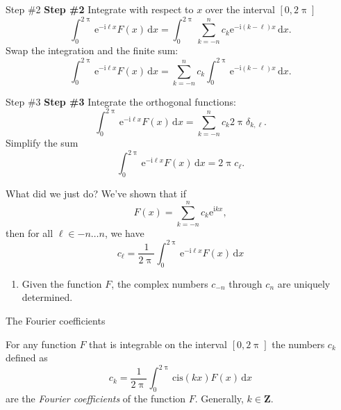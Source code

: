 \documentclass[portrait,fleqn,12pt]{beamer}
\newcommand{\integers}{\mathbf{Z}}
\newcommand{\cis}{\mathrm{cis}}
\newcommand{\euler}{\mathrm{e}}
\newcommand{\imag}{\mathrm{i}}
\newenvironment{handlist}
   {\begin{enumerate}[\faHandPointRight]
       \addtolength{\itemsep}{0.0\itemsep}}
     {\end{enumerate}}
\begin{document}
\begin{frame}{Step \#2}
    \textbf{Step \#2} Integrate with respect to $x$ over the 
    interval $[0, 2 \uppi]$
    \begin{equation}
       \int_0^{2 \uppi} \euler^{-\imag  \ell x} F(x) \,
         \mathrm{d}x =  \int_0^{2 \uppi} \sum_{k=-n}^n c_k 
        \euler^{-\imag  (k - \ell) x} \,
        \mathrm{d}x.
 \end{equation}
 Swap the integration and the finite sum:
 \begin{equation}
       \int_0^{2 \uppi} \euler^{-\imag  \ell x} F(x) \,
         \mathrm{d}x =  \sum_{k=-n}^n c_k 
         \int_0^{2 \uppi}  \euler^{-\imag  (k - \ell) x} \,   \mathrm{d}x.
 \end{equation}
 \end{frame}
 
 \begin{frame}{Step \#3}
   \textbf{Step \#3} Integrate the orthogonal functions:
   \begin{equation}
       \int_0^{2 \uppi} \euler^{-\imag  \ell x} F(x) \,
         \mathrm{d}x =  \sum_{k=-n}^n c_k  2 \uppi \delta_{k, \ell} .
       \end{equation}
   Simplify the sum
   \begin{equation}
       \int_0^{2 \uppi} \euler^{-\imag  \ell x} F(x) \,
         \mathrm{d}x =   2 \uppi c_\ell.
       \end{equation}
  
 \end{frame}
 
 \begin{frame}{What did we just do?}
 We've shown that if 
 \begin{equation}
    F(x) = \sum_{k=-n}^n c_k \euler^{\imag  k x},
\end{equation}
then for all $\ell \in -n \dots n$, we have
\begin{equation}
   c_\ell = \frac{1}{2 \uppi} \int_0^{2 \uppi} \euler^{-\imag  \ell x} F(x) \, \mathrm{d}x
\end{equation}
\begin{handlist}
\item Given the function $F$, the complex numbers $c_{-n}$ through $c_n$ are uniquely determined.
\end{handlist}
 \end{frame}
 
 \begin{frame}{The Fourier coefficients}
 
 For any function $F$ that is integrable on the interval $[0,2 \uppi]$ the numbers $c_k$ defined as
 \begin{equation*}
   c_k = \frac{1}{2 \uppi} \int_0^{2 \uppi} \cis(k x) F(x) \, \mathrm{d} x
 \end{equation*}
 are the \emph{Fourier coefficients} of the function $F$.  Generally, $k \in \integers$.
 
 
 \end{frame}
\end{document}
